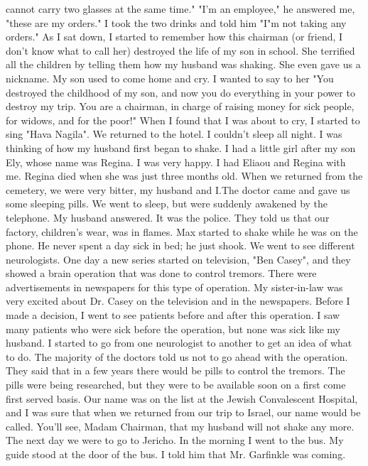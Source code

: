 cannot carry two glasses at the same time." "I'm an employee," he answered me, "these are my orders." I took the two drinks and told him 
"I"m not taking any orders." 
As I sat down, I started to remember how this chairman (or friend, I don't know what to call her) destroyed the life of my son in school. 
She terrified all the children by telling them how my husband was shaking. She even gave us a nickname. My son used to come home and cry. 
I wanted to say to her "You destroyed the childhood of my son, and now 
you do everything in your power to destroy my trip. You are a chairman, in charge of raising money for sick people, for widows, and for the poor!" 
When I found that I was about to cry, I started to sing "Hava Nagila". 
We returned to the hotel. I couldn't sleep all night. I was thinking of how my husband first began to shake. I had a little girl after my son Ely, whose name was Regina. I was very happy. I had Eliaou and Regina with me. Regina died when she was just three months old. 
When we returned from the cemetery, we were very bitter, my husband and 
I.The doctor came and gave us some sleeping pills. We went to sleep, 
but were suddenly awakened by the telephone. My husband answered. It 
was the police. They told us that our factory, children's wear, was in 
flames. Max started to shake while he was on the phone. 
He never spent a day sick in bed; he just shook. We went to see 
different neurologists. One day a new series started on television, 
"Ben Casey", and they showed a brain operation that was done to control 
tremors. There were advertisements in newspapers for this type 
of operation. My sister-in-law was very excited about Dr. Casey on 
the television and in the newspapers. Before I made a decision, I went 
to see patients before and after this operation. I saw many patients 
who were sick before the operation, but none was sick like my husband. 
I started to go from one neurologist to another to get an idea of what 
to do. The majority of the doctors told us not to go ahead with 
the operation. They said that in a few years there would be pills to 
control the tremors. The pills were being researched, but they were to 
be available soon on a first come first served basis. Our name was on 
the list at the Jewish Convalescent Hospital, and I was sure that when 
we returned from our trip to Israel, our name would be called. You'll 
see, Madam Chairman, that my husband will not shake any more. 
The next day we were to go to Jericho. In the morning I went to
the bus. My guide stood at the door of the bus. I told him that Mr. 
Garfinkle was coming. 
